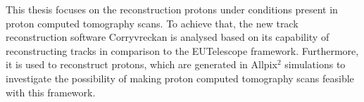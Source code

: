 This thesis focuses on the reconstruction protons under conditions present in proton computed tomography scans. To achieve that, the new track reconstruction software
Corryvreckan is analysed based on its capability of reconstructing tracks in comparison to the EUTelescope framework. Furthermore, it is used to reconstruct
protons, which are generated in Allpix$^2$ simulations to investigate the possibility of making proton computed tomography scans feasible with this framework.




%
